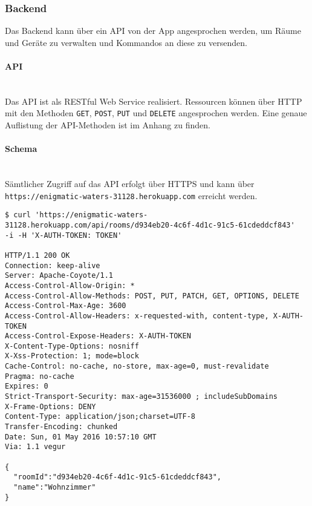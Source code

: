 \subsubsection{Backend}
Das Backend kann über ein API von der App angesprochen werden, um Räume und Geräte zu verwalten und Kommandos an diese zu versenden.

\paragraph{API}\mbox{}\\
Das API ist als RESTful Web Service realisiert. Ressourcen können über HTTP mit den Methoden \colorbox{pregray}{\lstinline{GET}}, \colorbox{pregray}{\lstinline{POST}}, \colorbox{pregray}{\lstinline{PUT}} und \colorbox{pregray}{\lstinline{DELETE}} angesprochen werden. Eine genaue Auflistung der API-Methoden ist im Anhang zu finden.

\paragraph{Schema}\mbox{}\\
Sämtlicher Zugriff auf das API erfolgt über HTTPS und kann über \colorbox{pregray}{\lstinline{https://enigmatic-waters-31128.herokuapp.com}} erreicht werden.

\vspace{2em}
\begin{lstlisting}
$ curl 'https://enigmatic-waters-31128.herokuapp.com/api/rooms/d934eb20-4c6f-4d1c-91c5-61cdeddcf843' 
-i -H 'X-AUTH-TOKEN: TOKEN'

HTTP/1.1 200 OK
Connection: keep-alive
Server: Apache-Coyote/1.1
Access-Control-Allow-Origin: *
Access-Control-Allow-Methods: POST, PUT, PATCH, GET, OPTIONS, DELETE
Access-Control-Max-Age: 3600
Access-Control-Allow-Headers: x-requested-with, content-type, X-AUTH-TOKEN
Access-Control-Expose-Headers: X-AUTH-TOKEN
X-Content-Type-Options: nosniff
X-Xss-Protection: 1; mode=block
Cache-Control: no-cache, no-store, max-age=0, must-revalidate
Pragma: no-cache
Expires: 0
Strict-Transport-Security: max-age=31536000 ; includeSubDomains
X-Frame-Options: DENY
Content-Type: application/json;charset=UTF-8
Transfer-Encoding: chunked
Date: Sun, 01 May 2016 10:57:10 GMT
Via: 1.1 vegur

{
  "roomId":"d934eb20-4c6f-4d1c-91c5-61cdeddcf843",
  "name":"Wohnzimmer"
}
\end{lstlisting}
\vspace{2em}

